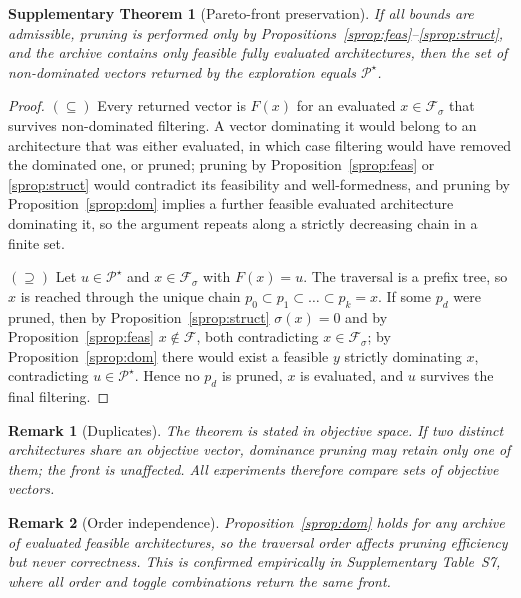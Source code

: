 \documentclass[pdflatex,sn-nature]{sn-jnl}
\newcommand{\F}{\mathcal{F}}
\newcommand{\PS}{\mathcal{P}^{\star}}
\theoremstyle{thmstyleone}
\newtheorem{theorem}{Supplementary Theorem}
\theoremstyle{thmstyletwo}
\newtheorem{remark}{Remark}
\theoremstyle{thmstylethree}
\begin{document}
\begin{theorem}[Pareto-front preservation]\label{sthm:front}
If all bounds are admissible, pruning is performed only by
Propositions~\ref{sprop:feas}--\ref{sprop:struct}, and the archive contains only feasible
fully evaluated architectures, then the set of non-dominated vectors returned by the
exploration equals $\PS$.
\end{theorem}
\begin{proof}
$(\subseteq)$ Every returned vector is $F(x)$ for an evaluated $x\in\F_\sigma$ that
survives non-dominated filtering. A vector dominating it would belong to an architecture
that was either evaluated, in which case filtering would have removed the dominated one,
or pruned; pruning by Proposition~\ref{sprop:feas} or \ref{sprop:struct} would contradict
its feasibility and well-formedness, and pruning by Proposition~\ref{sprop:dom} implies a
further feasible evaluated architecture dominating it, so the argument repeats along a
strictly decreasing chain in a finite set.

$(\supseteq)$ Let $u\in\PS$ and $x\in\F_\sigma$ with $F(x)=u$. The traversal is a prefix
tree, so $x$ is reached through the unique chain
$p_0\subset p_1\subset\dots\subset p_k=x$. If some $p_d$ were pruned, then by
Proposition~\ref{sprop:struct} $\sigma(x)=0$ and by Proposition~\ref{sprop:feas}
$x\notin\F$, both contradicting $x\in\F_\sigma$; by Proposition~\ref{sprop:dom} there
would exist a feasible $y$ strictly dominating $x$, contradicting $u\in\PS$. Hence no
$p_d$ is pruned, $x$ is evaluated, and $u$ survives the final filtering.
\end{proof}

\begin{remark}[Duplicates]
The theorem is stated in objective space. If two distinct architectures share an
objective vector, dominance pruning may retain only one of them; the front is unaffected.
All experiments therefore compare sets of objective vectors.
\end{remark}

\begin{remark}[Order independence]
Proposition~\ref{sprop:dom} holds for any archive of evaluated feasible architectures, so
the traversal order affects pruning efficiency but never correctness. This is confirmed
empirically in Supplementary Table~S7, where all order and toggle combinations return the
same front.
\end{remark}
\end{document}

